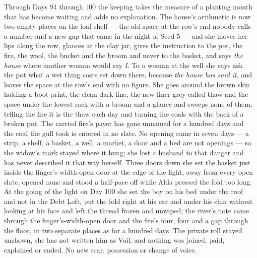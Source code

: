\documentclass{design/chronicle}
\begin{document}
{Through Days 94 through 100 the keeping takes the measure of a planting month that has become waiting and adds no explanation. The house’s arithmetic is now two empty places on the loaf shelf --- the old space at the row’s end nobody calls a number and a new gap that came in the night of Seed 5 --- and she moves her lips along the row, glances at the clay jar, gives the instruction to the pot, the fire, the wool, the bucket and the broom and never to the basket, and says \emph{the house} where another woman would say \emph{I}. To a woman at the well she says ask the pot what a wet thing costs set down there, because \emph{the house has said it}, and leaves the space at the row’s end with no figure. She goes around the brown skin holding a boot-print, the clean dark line, the new finer grey called thaw and the space under the lowest rack with a broom and a glance and sweeps none of them, telling the fire it is the thaw each day and turning the coals with the back of a broken pot. The carried fire’s payer has gone unnamed for a hundred days and the coal the gull took is entered in no slate. No opening came in seven days --- a strip, a shelf, a basket, a well, a market, a door and a bed are not openings --- so the widow’s mark stayed where it hung; she lost a husband to that danger and has never described it that way herself. Three doors down she set the basket just inside the finger’s-width-open door at the edge of the light, away from every open slate, opened none and stood a half-pace off while Alda pressed the fold too long. At the going of the light on Day 100 she set the boy on his bed under the roof and not in the Debt Loft, put the fold right at his ear and under his chin without looking at his face and left the thread frozen and unwiped; the river’s note came through the finger’s-width-open door and the fire’s four, four and a gap through the floor, in two separate places as for a hundred days. The private roll stayed unshown, she has not written him as Vail, and nothing was joined, paid, explained or ended. No new scar, possession or change of voice.

}
\end{document}
